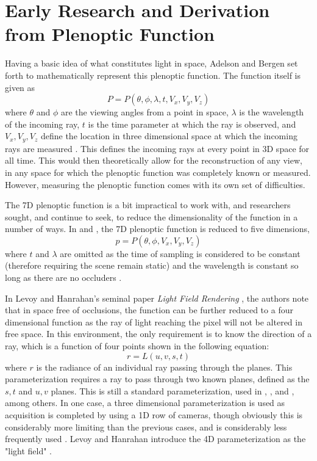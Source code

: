 \documentclass[12pt]{report}
\begin{document}
\section{Early Research and Derivation from Plenoptic Function}
Having a basic idea of what constitutes light in space, Adelson and Bergen set forth to mathematically represent this plenoptic function.
The function itself is given as 
\begin{equation}
P=P(\theta,\phi,\lambda,t,V_x, V_y,V_z)
\end{equation}
where $\theta$ and $\phi$ are the viewing angles from a point in space, $\lambda$ is the wavelength of the incoming ray, $t$ is the time parameter at which the ray is observed, and $V_x,V_y,V_z$ define the location in three dimensional space at which the incoming rays are measured \cite{Adelson91}. This defines the incoming rays at every point in 3D space for all time. This would then theoretically allow for the reconstruction of any view, in any space for which the plenoptic function was completely known or measured. However, measuring the plenoptic function comes with its own set of difficulties.

The 7D plenoptic function is a bit impractical to work with, and researchers sought, and continue to seek, to reduce the dimensionality of the function in a number of ways. In \cite{McMillan95} and \cite{Huang14}, the 7D plenoptic function is reduced to five dimensions,
\begin{equation}
p=P(\theta,\phi,V_x,V_y,V_z)
\end{equation}
where $t$ and $\lambda$ are omitted as the time of sampling is considered to be constant (therefore requiring the scene remain static) and the wavelength is constant so long as there are no occluders \cite{Levoy06a}. 

In Levoy and Hanrahan's seminal paper \emph{Light Field Rendering} \cite{Levoy96}, the authors note that in space free of occlusions, the function can be further reduced to a four dimensional function as the ray of light reaching the pixel will not be altered in free space. In this environment, the only requirement is to know the direction of a ray, which is a function of four points shown in the following equation:
\begin{equation}
r=L(u,v,s,t)
\end{equation}
where $r$ is the radiance of an individual ray passing through the planes. This parameterization requires a ray to pass through two known planes, defined as the $s,t$ and $u,v$ planes. This is  still a standard parameterization, used in \cite{Isaksen01}, \cite{Vaish06}, and \cite{Oberlin16}, among others. In one case, a three dimensional parameterization is used as acquisition is completed by using a 1D row of cameras, though obviously this is considerably more limiting than the previous cases, and is considerably less frequently used \cite{Kim13}. Levoy and Hanrahan introduce the 4D parameterization as the "light field" \cite{Levoy96}.
\end{document}

